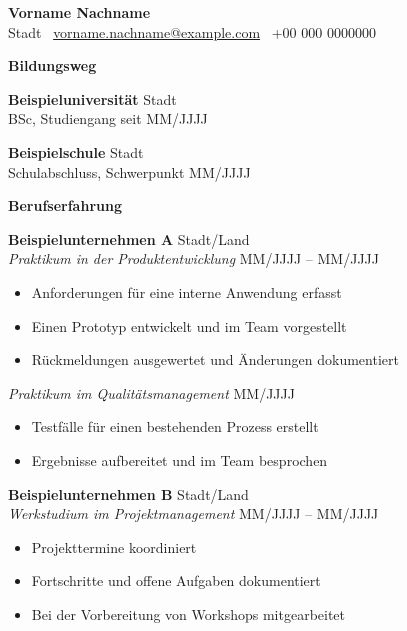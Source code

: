 \documentclass[11pt]{article}
\begin{document}
\begin{center}
    {\LARGE\textbf{Vorname Nachname}} \\
    \vspace{2.5pt}
    Stadt \textbullet\
    \href{mailto:vorname.nachname@example.com}{vorname.nachname@example.com} \textbullet\
    +00 000 0000000
\end{center}

\vspace{0.5pt}
\pagestyle{empty}

\begin{center}
    \textbf{\Large Bildungsweg}
    \hrulefill
\end{center}

\textbf{Beispieluniversität} \hfill Stadt \\
BSc, Studiengang \hfill seit MM/JJJJ

\vspace{12pt}

\textbf{Beispielschule} \hfill Stadt \\
Schulabschluss, Schwerpunkt \hfill MM/JJJJ

\vspace{12pt}

\begin{center}
    \textbf{\Large Berufserfahrung}
    \hrulefill
\end{center}

\textbf{Beispielunternehmen A} \hfill Stadt/Land \\
\textit{Praktikum in der Produktentwicklung} \hfill MM/JJJJ -- MM/JJJJ
\begin{itemize}[noitemsep, topsep=0pt, parsep=0pt]
    \item Anforderungen für eine interne Anwendung erfasst
    \item Einen Prototyp entwickelt und im Team vorgestellt
    \item Rückmeldungen ausgewertet und Änderungen dokumentiert
\end{itemize}

\vspace{6pt}
\textit{Praktikum im Qualitätsmanagement} \hfill MM/JJJJ
\begin{itemize}[noitemsep, topsep=0pt, parsep=0pt]
    \item Testfälle für einen bestehenden Prozess erstellt
    \item Ergebnisse aufbereitet und im Team besprochen
\end{itemize}

\vspace{12pt}
\textbf{Beispielunternehmen B} \hfill Stadt/Land \\
\textit{Werkstudium im Projektmanagement} \hfill MM/JJJJ -- MM/JJJJ
\begin{itemize}[noitemsep, topsep=0pt, parsep=0pt]
    \item Projekttermine koordiniert
    \item Fortschritte und offene Aufgaben dokumentiert
    \item Bei der Vorbereitung von Workshops mitgearbeitet
\end{itemize}
\end{document}
